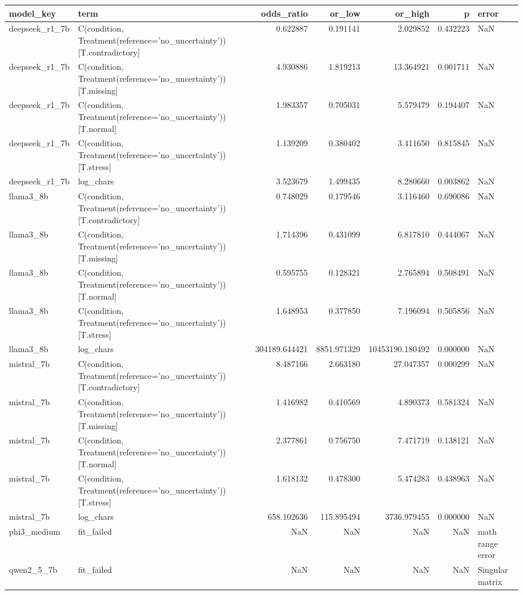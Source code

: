 \begin{tabular}{llrrrrl}
\toprule
model\_key & term & odds\_ratio & or\_low & or\_high & p & error \\
\midrule
deepseek\_r1\_7b & C(condition, Treatment(reference='no\_uncertainty'))[T.contradictory] & 0.622887 & 0.191141 & 2.029852 & 0.432223 & NaN \\
deepseek\_r1\_7b & C(condition, Treatment(reference='no\_uncertainty'))[T.missing] & 4.930886 & 1.819213 & 13.364921 & 0.001711 & NaN \\
deepseek\_r1\_7b & C(condition, Treatment(reference='no\_uncertainty'))[T.normal] & 1.983357 & 0.705031 & 5.579479 & 0.194407 & NaN \\
deepseek\_r1\_7b & C(condition, Treatment(reference='no\_uncertainty'))[T.stress] & 1.139209 & 0.380402 & 3.411650 & 0.815845 & NaN \\
deepseek\_r1\_7b & log\_chars & 3.523679 & 1.499435 & 8.280660 & 0.003862 & NaN \\
llama3\_8b & C(condition, Treatment(reference='no\_uncertainty'))[T.contradictory] & 0.748029 & 0.179546 & 3.116460 & 0.690086 & NaN \\
llama3\_8b & C(condition, Treatment(reference='no\_uncertainty'))[T.missing] & 1.714396 & 0.431099 & 6.817810 & 0.444067 & NaN \\
llama3\_8b & C(condition, Treatment(reference='no\_uncertainty'))[T.normal] & 0.595755 & 0.128321 & 2.765894 & 0.508491 & NaN \\
llama3\_8b & C(condition, Treatment(reference='no\_uncertainty'))[T.stress] & 1.648953 & 0.377850 & 7.196094 & 0.505856 & NaN \\
llama3\_8b & log\_chars & 304189.644421 & 8851.971329 & 10453190.180492 & 0.000000 & NaN \\
mistral\_7b & C(condition, Treatment(reference='no\_uncertainty'))[T.contradictory] & 8.487166 & 2.663180 & 27.047357 & 0.000299 & NaN \\
mistral\_7b & C(condition, Treatment(reference='no\_uncertainty'))[T.missing] & 1.416982 & 0.410569 & 4.890373 & 0.581324 & NaN \\
mistral\_7b & C(condition, Treatment(reference='no\_uncertainty'))[T.normal] & 2.377861 & 0.756750 & 7.471719 & 0.138121 & NaN \\
mistral\_7b & C(condition, Treatment(reference='no\_uncertainty'))[T.stress] & 1.618132 & 0.478300 & 5.474283 & 0.438963 & NaN \\
mistral\_7b & log\_chars & 658.102636 & 115.895494 & 3736.979455 & 0.000000 & NaN \\
phi3\_medium & fit\_failed & NaN & NaN & NaN & NaN & math range error \\
qwen2\_5\_7b & fit\_failed & NaN & NaN & NaN & NaN & Singular matrix \\
\bottomrule
\end{tabular}
